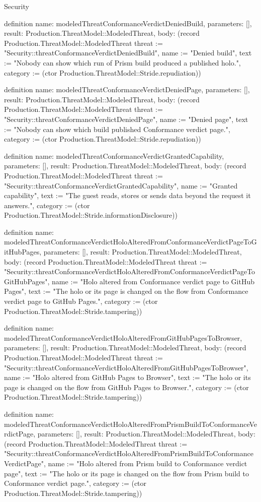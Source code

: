 \begin{lexlean}{Security}
\begin{semanticmodule}
definition{
  name: modeledThreatConformanceVerdictDeniedBuild,
  parameters: [],
  result: Production.ThreatModel::ModeledThreat,
  body: (record Production.ThreatModel::ModeledThreat {threat := "Security::threatConformanceVerdictDeniedBuild", name := "Denied build", text := "Nobody can show which run of Prism build produced a published holo.", category := (ctor Production.ThreatModel::Stride.repudiation)})
}

definition{
  name: modeledThreatConformanceVerdictDeniedPage,
  parameters: [],
  result: Production.ThreatModel::ModeledThreat,
  body: (record Production.ThreatModel::ModeledThreat {threat := "Security::threatConformanceVerdictDeniedPage", name := "Denied page", text := "Nobody can show which build published Conformance verdict page.", category := (ctor Production.ThreatModel::Stride.repudiation)})
}

definition{
  name: modeledThreatConformanceVerdictGrantedCapability,
  parameters: [],
  result: Production.ThreatModel::ModeledThreat,
  body: (record Production.ThreatModel::ModeledThreat {threat := "Security::threatConformanceVerdictGrantedCapability", name := "Granted capability", text := "The guest reads, stores or sends data beyond the request it answers.", category := (ctor Production.ThreatModel::Stride.informationDisclosure)})
}

definition{
  name: modeledThreatConformanceVerdictHoloAlteredFromConformanceVerdictPageToGitHubPages,
  parameters: [],
  result: Production.ThreatModel::ModeledThreat,
  body: (record Production.ThreatModel::ModeledThreat {threat := "Security::threatConformanceVerdictHoloAlteredFromConformanceVerdictPageToGitHubPages", name := "Holo altered from Conformance verdict page to GitHub Pages", text := "The holo or its page is changed on the flow from Conformance verdict page to GitHub Pages.", category := (ctor Production.ThreatModel::Stride.tampering)})
}

definition{
  name: modeledThreatConformanceVerdictHoloAlteredFromGitHubPagesToBrowser,
  parameters: [],
  result: Production.ThreatModel::ModeledThreat,
  body: (record Production.ThreatModel::ModeledThreat {threat := "Security::threatConformanceVerdictHoloAlteredFromGitHubPagesToBrowser", name := "Holo altered from GitHub Pages to Browser", text := "The holo or its page is changed on the flow from GitHub Pages to Browser.", category := (ctor Production.ThreatModel::Stride.tampering)})
}

definition{
  name: modeledThreatConformanceVerdictHoloAlteredFromPrismBuildToConformanceVerdictPage,
  parameters: [],
  result: Production.ThreatModel::ModeledThreat,
  body: (record Production.ThreatModel::ModeledThreat {threat := "Security::threatConformanceVerdictHoloAlteredFromPrismBuildToConformanceVerdictPage", name := "Holo altered from Prism build to Conformance verdict page", text := "The holo or its page is changed on the flow from Prism build to Conformance verdict page.", category := (ctor Production.ThreatModel::Stride.tampering)})
}


\end{semanticmodule}
\end{lexlean}
